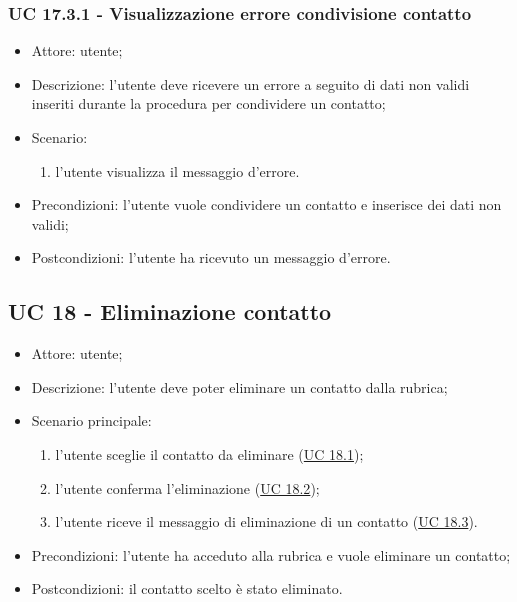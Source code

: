 \subsubsection{UC 17.3.1 - Visualizzazione errore condivisione contatto} \label{sec: UC 17.3.1}
\begin{itemize}
    \item Attore: utente;
    \item Descrizione: l'utente deve ricevere un errore a seguito di dati non validi inseriti durante la procedura per condividere un contatto;
    \item Scenario:
        \begin{enumerate}
        \item l'utente visualizza il messaggio d'errore.
        \end{enumerate}
    
    \item Precondizioni: l'utente vuole condividere un contatto e inserisce dei dati non validi;
    \item Postcondizioni: l'utente ha ricevuto un messaggio d'errore.
\end{itemize}



\subsection{UC 18 - Eliminazione contatto}
\begin{itemize}
    \item Attore: utente;
    \item Descrizione: l'utente deve poter eliminare un contatto dalla rubrica;
    \item Scenario principale:
        \begin{enumerate}
        \item l'utente sceglie il contatto da eliminare (\hyperref[sec: UC 18.1]{UC 18.1});
        \item l'utente conferma l'eliminazione (\hyperref[sec: UC 18.2]{UC 18.2});
        \item l'utente riceve il messaggio di eliminazione di un contatto (\hyperref[sec: UC 18.3]{UC 18.3}).
        \end{enumerate}
    \item Precondizioni: l'utente ha acceduto alla rubrica e vuole eliminare un contatto;
    \item Postcondizioni: il contatto scelto è stato eliminato.
\end{itemize}

